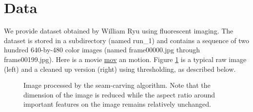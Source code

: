 \documentclass[]{article}
\begin{document}
\section{Data}
We provide dataset obtained by William Ryu using fluorescent imaging. The dataset is stored in a subdirectory (named run\_1) and contains a sequence of two hundred 640-by-480 color images (named frame00000.jpg through frame00199.jpg). Here is a movie \href{https://www.cs.princeton.edu/courses/archive/spring17/cos126/assignments/atomic-files/atomic.mov}{mov} an motion. Figure \ref{fig:beads} is a typical raw image (left) and a cleaned up version (right) using thresholding, as described below.

\begin{figure}[h]
    \hfill%
    \hfill%
    \hfill%
    \hfill%
    \hfill%
    \hfill%
    \hfill%
    \hfill%
    \hfill%
    \hfill%
	\caption{Image processed by the seam-carving algorithm. Note that the dimension of the image is reduced while the aspect ratio around important features on the image remains relatively unchanged.} \label{fig:beads}
    \hfill%
\end{figure}
\end{document}
